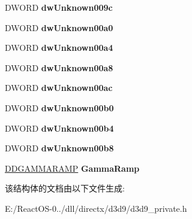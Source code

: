 \begin{DoxyCompactItemize}
\mbox{\label{struct___d3_d9___unknown6_b_c_a2f66a588920b097da751fbe94fe5befd}} 
D\+W\+O\+RD {\bfseries dw\+Unknown009c}
\item 
\mbox{\label{struct___d3_d9___unknown6_b_c_a801cf79546985f8771ca4f70be51a116}} 
D\+W\+O\+RD {\bfseries dw\+Unknown00a0}
\item 
\mbox{\label{struct___d3_d9___unknown6_b_c_a23b7f2141973deeeeefc04c247f62ff8}} 
D\+W\+O\+RD {\bfseries dw\+Unknown00a4}
\item 
\mbox{\label{struct___d3_d9___unknown6_b_c_a56bee02bdfa29a3d01d5604f9587c44a}} 
D\+W\+O\+RD {\bfseries dw\+Unknown00a8}
\item 
\mbox{\label{struct___d3_d9___unknown6_b_c_a428b1a2ecbe3c92e6ec70206731fc297}} 
D\+W\+O\+RD {\bfseries dw\+Unknown00ac}
\item 
\mbox{\label{struct___d3_d9___unknown6_b_c_ab7f7727930fe7865f8310cb020efd727}} 
D\+W\+O\+RD {\bfseries dw\+Unknown00b0}
\item 
\mbox{\label{struct___d3_d9___unknown6_b_c_a693195e59325e043d504014fc5ed2213}} 
D\+W\+O\+RD {\bfseries dw\+Unknown00b4}
\item 
\mbox{\label{struct___d3_d9___unknown6_b_c_a6a01f61761f6f41acb711803f7b6e079}} 
D\+W\+O\+RD {\bfseries dw\+Unknown00b8}
\item 
\mbox{\label{struct___d3_d9___unknown6_b_c_a9608cdb0aaf87f0385dc6f36eb9dc159}} 
\hyperlink{struct___d_d_g_a_m_m_a_r_a_m_p}{D\+D\+G\+A\+M\+M\+A\+R\+A\+MP} {\bfseries Gamma\+Ramp}
\end{DoxyCompactItemize}


该结构体的文档由以下文件生成\+:\begin{DoxyCompactItemize}
\item 
E\+:/\+React\+O\+S-\/0../dll/directx/d3d9/d3d9\+\_\+private.\+h\end{DoxyCompactItemize}
